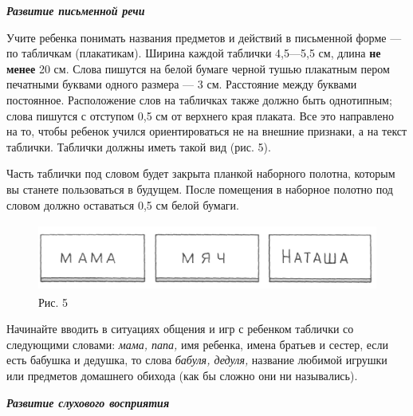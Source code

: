\documentclass[a5paper]{book}
\renewcommand{\emph}[1]{\textit{#1}}
\begin{document}
\emph{\textbf{Развитие письменной речи}}

Учите ребенка понимать названия предметов и действий в письменной форме
--- по табличкам (плакатикам). Ширина каждой таблички 4,5---5,5 см,
длина \textbf{не менее} 20 см. Слова пишутся на белой бумаге черной
тушью плакатным пером печатными буквами одного размера --- 3 см.
Расстояние между буквами постоянное. Расположение слов на табличках
также должно быть однотипным; слова пишутся с отступом 0,5 см от
верхнего края плаката. Все это направлено на то, чтобы ребенок учился
ориентироваться не на внешние признаки, а на текст таблички. Таблички
должны иметь такой вид (рис. 5).

Часть таблички под словом будет закрыта планкой наборного полотна,
которым вы станете пользоваться в будущем. После помещения в наборное
полотно под словом должно оставаться 0,5 см белой бумаги.


\begin{figure}
\centering
\includegraphics[width=4.71319in,height=0.87361in]{media/media/image5.jpg}
\caption*{Рис. 5}
\end{figure}

Начинайте вводить в ситуациях общения и игр с ребенком таблички со
следующими словами: \emph{мама, папа,} имя ребенка, имена братьев и
сестер, если есть бабушка и дедушка, то слова \emph{бабуля, дедуля,}
название любимой игрушки или предметов домашнего обихода (как бы сложно
они ни назывались).

\emph{\textbf{Развитие слухового восприятия}}
\end{document}
